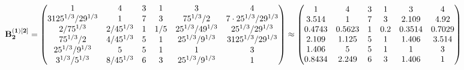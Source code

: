 \documentclass[10pt,a4paper]{article}
\begin{document}
	\[
		\bold{B_2^{(1)[2]}} = 
		\begin{pmatrix}
			{1}{} & {{4}}{} & {{3}}{} & {1}{} & {{3}}{} & {{4}}{} \\
			{{3125^ {1 / 3}}} / {{2}{9^ {1 / 3}}} & {1}{} & {{7}}{} & {{3}}{} & {{75^ {1 / 3}}} / {{2}} & {{7} \cdot {25^ {1 / 3}}} / {{2}{9^ {1 / 3}}} \\
			{{2}} / {{75^ {1 / 3}}} & {{2}} / {{45^ {1 / 3}}} & {1}{} & {1} / {{5}} & {{25^ {1 / 3}}} / {{4}{9^ {1 / 3}}} & {{25^ {1 / 3}}} / {{2}{9^ {1 / 3}}} \\
			{{75^ {1 / 3}}} / {{2}} & {{4}} / {{45^ {1 / 3}}} & {{5}}{} & {1}{} & {{25^ {1 / 3}}} / {{9^ {1 / 3}}} & {{3125^ {1 / 3}}} / {{2}{9^ {1 / 3}}} \\
			{{25^ {1 / 3}}} / {{9^ {1 / 3}}} & {{5}}{} & {{5}}{} & {1}{} & {1}{} & {{3}}{} \\
			{{3^ {1 / 3}}} / {{5^ {1 / 3}}} & {{8}} / {{45^ {1 / 3}}} & {{6}}{} & {{3}}{} & {{25^ {1 / 3}}} / {{9^ {1 / 3}}} & {1}{} \\
		\end{pmatrix}
		\approx
		\begin{pmatrix}
			1        & 4        & 3        & 1        & 3        & 4        \\
			3.514    & 1        & 7        & 3        & 2.109    & 4.92     \\
			0.4743   & 0.5623   & 1        & 0.2      & 0.3514   & 0.7029   \\
			2.109    & 1.125    & 5        & 1        & 1.406    & 3.514    \\
			1.406    & 5        & 5        & 1        & 1        & 3        \\
			0.8434   & 2.249    & 6        & 3        & 1.406    & 1        \\
		\end{pmatrix}
	\]
\end{document}
